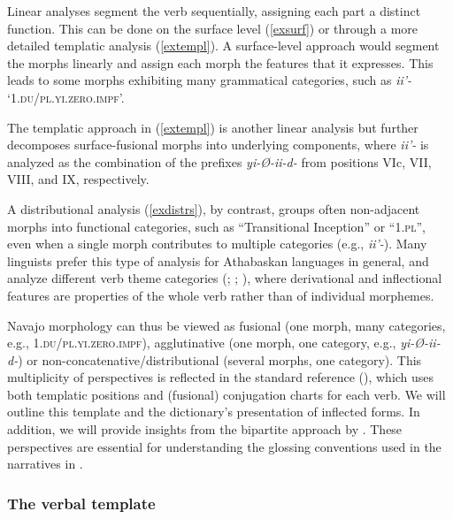 Linear analyses segment the verb sequentially, assigning each part a distinct function. This can be done on the surface level (\ref{exsurf}) or through a more detailed templatic analysis (\ref{extempl}). A surface-level approach would segment the morphs linearly and assign each morph the features that it expresses. This leads to some morphs exhibiting many grammatical categories, such as \textit{ii'-} `1.\textsc{du}/\textsc{pl}.\textsc{yi}.\textsc{zero}.\textsc{impf}'.

The templatic approach in (\ref{extempl}) is another linear analysis but further decomposes surface-fusional morphs into underlying components, where \textit{ii'-} is analyzed as the combination of the prefixes \textit{yi-Ø-ii-d-} from positions VIc, VII, VIII, and IX, respectively.

A distributional analysis (\ref{exdistrs}), by contrast, groups often non-adjacent morphs into functional categories, such as ``Transitional Inception'' or ``1.\textsc{pl}'', even when a single morph contributes to multiple categories (e.g., \textit{ii'-}). Many linguists prefer this type of analysis for Athabaskan languages in general, and analyze different verb theme categories (\cite{Slate:1989kg}; \cite{Kari:1989ja}; \cite{Hardy:1979jc}), where derivational and inflectional features are properties of the whole verb rather than of individual morphemes.

Navajo morphology can thus be viewed as fusional (one morph, many categories, e.g., 1.\textsc{du}/\textsc{pl}.\textsc{yi}.\textsc{zero}.\textsc{impf}), agglutinative (one morph, one category, e.g., \textit{yi-Ø-ii-d-}) or non-concatenative/distributional (several morphs, one category). This multiplicity of perspectives is reflected in the standard reference (\cite{Young:1987uj, Young:1992bd}), which uses both templatic positions and (fusional) conjugation charts for each verb. We will outline this template and the dictionary's presentation of inflected forms. In addition, we will provide insights from the bipartite approach by \citet{McDonough:1990gn}. These perspectives are essential for understanding the glossing conventions used in the narratives in .

\subsubsection{The verbal template}

